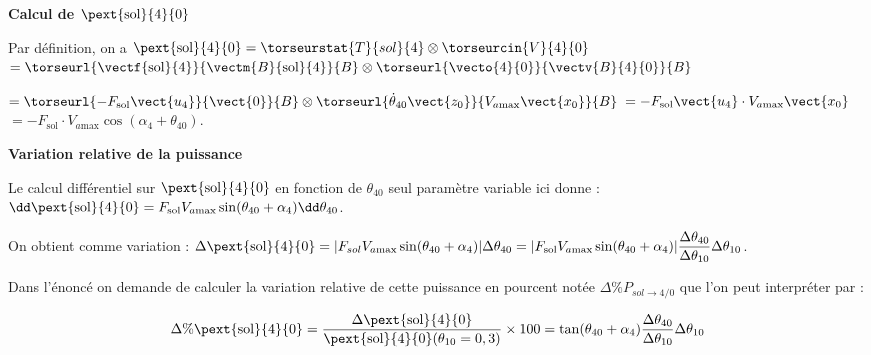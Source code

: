 \documentclass[11pt]{article}
\begin{document}
\begin{UPSTIcorrige}
\textbf{Calcul de $\pext{\text{sol}}{4}{0}$}

Par définition, on a $\pext{\text{sol}}{4}{0} = \torseurstat{T}{sol}{4} \otimes \torseurcin{V}{4}{0}$
$ = \torseurl{\vectf{\text{sol}}{4}}{\vectm{B}{\text{sol}}{4}}{B} \otimes \torseurl{\vecto{4}{0}}{\vectv{B}{4}{0}}{B}$

$ = \torseurl{-F_{\text{sol}}\vect{u_4}}{\vect{0}}{B} \otimes \torseurl{\dot{\theta}_{40}\vect{z_0}}{V_{a \text{max}} \vect{x_0}}{B} $ $ = -F_{\text{sol}}\vect{u_4} \cdot V_{a \text{max}} \vect{x_0}$
$ = -F_{\text{sol}}\cdot V_{a \text{max}} \cos \left(\alpha_4 + \theta_{40}\right) $.


\textbf{Variation relative de la puissance}


%
%
%
%

Le calcul différentiel sur  $\pext{\text{sol}}{4}{0}$ en fonction de $\theta_{40}$ seul paramètre variable ici donne : 
$
\dd \pext{\text{sol}}{4}{0}=F_{\text{sol}}V_{a \text{max}}\sin (\theta_{40}+\alpha_4)\dd \theta_{40}
$.

On obtient comme variation : 
$
\Delta  \pext{\text{sol}}{4}{0} =\vert F_{sol}V_{a \text{max}}\sin (\theta_{40}+\alpha_4) \vert\Delta \theta_{40}=\vert F_{\text{sol}}V_{a \text{max}}\sin (\theta_{40}+\alpha_4)\vert\dfrac{\Delta \theta_{40}}{\Delta \theta_{10}} \Delta \theta_{10}
$.

Dans l'énoncé on demande de calculer la variation relative de cette puissance en pourcent notée $\Delta \% P_{sol\to 4/0}$ que l'on peut interpréter par : 

\begin{align*}
\Delta \%\pext{\text{sol}}{4}{0}=\dfrac{\Delta \pext{\text{sol}}{4}{0}}{\pext{\text{sol}}{4}{0}(\theta_{10}=0,3)}\times 100=\tan (\theta_{40}+\alpha_4)\dfrac{\Delta \theta_{40}}{\Delta \theta_{10}} \Delta \theta_{10}
\end{align*}



\end{UPSTIcorrige}
\end{document}
